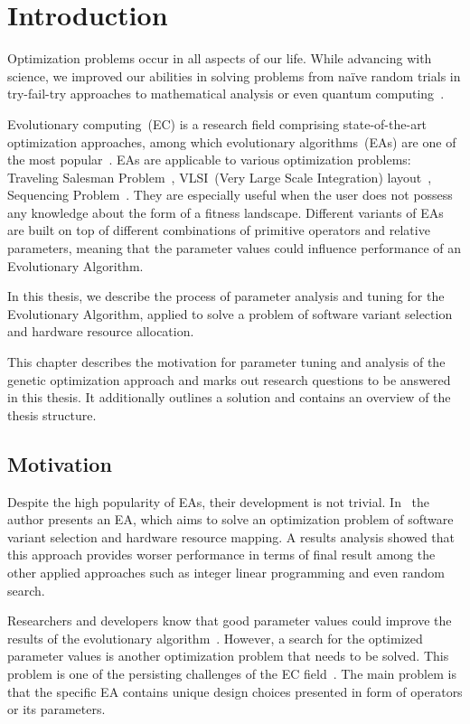 \chapter{Introduction}\label{intro}

Optimization problems occur in all aspects of our life.  While advancing with science, we improved our abilities in solving problems from naïve random trials in try-fail-try approaches to mathematical analysis or even quantum computing~\cite{hogg2000quantum}.

Evolutionary computing~(EC) is a research field comprising state-of-the-art optimization approaches, among which evolutionary algorithms~(EAs) are one of the most popular~\cite{vikhar16}. EAs are applicable to various optimization problems: Traveling Salesman Problem~\cite{carter2006new}, VLSI~(Very Large Scale Integration) layout~\cite{shahookar1990genetic}, Sequencing Problem~\cite{gockel1997influencing}. They are especially useful when the user does not possess any knowledge about the form of a fitness landscape. Different variants of EAs are built on top of different combinations of primitive operators and relative parameters, meaning that the parameter values could influence performance of an Evolutionary Algorithm. 

In this thesis, we describe the process of parameter analysis and tuning for the Evolutionary Algorithm, applied to solve a problem of software variant selection and hardware resource allocation.


This chapter describes the motivation for parameter tuning and analysis of the genetic optimization approach and marks out research questions to be answered in this thesis. It additionally outlines a solution and contains an overview of the thesis structure.

\section{Motivation}

Despite the high popularity of EAs, their development is not trivial.
In~\cite{ahmad18} the author presents an EA, which aims to solve an optimization problem of software variant selection and hardware resource mapping. A results analysis showed that this approach provides worser performance in terms of final result among the other applied approaches such as integer linear programming and even random search.


Researchers and developers know that good parameter values could improve the results of the evolutionary algorithm~\cite{eiben03}. However, a search for the optimized parameter values is another optimization problem that needs to be solved. This problem is one of the persisting challenges of the EC field~\cite{smit2010parameter}. The main problem is that the specific EA contains unique design choices presented in form of operators or its parameters.  


